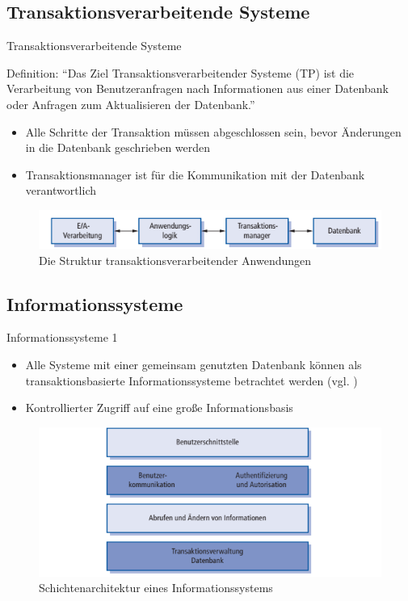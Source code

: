 \documentclass{beamer}
\begin{document}
		\subsection{Transaktionsverarbeitende Systeme}
			\begin{frame}{Transaktionsverarbeitende Systeme}
				\begin{block}{Definition:}
					\enquote{Das Ziel Transaktionsverarbeitender Systeme (TP) ist die Verarbeitung von Benutzeranfragen nach Informationen aus einer Datenbank oder Anfragen zum Aktualisieren der Datenbank.} \cite[S. 204]{sommer}
				\end{block}
				\begin{itemize}
					\item Alle Schritte der Transaktion müssen abgeschlossen sein, bevor Änderungen in die Datenbank geschrieben werden
					\item Transaktionsmanager ist für die Kommunikation mit der Datenbank verantwortlich
				\end{itemize}
				\begin{figure}
					\includegraphics[width=\textwidth]{transaktionssystem-1.png}
					\caption{Die Struktur transaktionsverarbeitender Anwendungen \cite[S. 204]{sommer}}
				\end{figure}
			\end{frame}
		\subsection{Informationssysteme}
			\begin{frame}{Informationssysteme 1}
			\begin{itemize}
				\item Alle Systeme mit einer gemeinsam genutzten Datenbank können als transaktionsbasierte Informationssysteme betrachtet werden (vgl. \cite[S. 205]{sommer})
				\item Kontrollierter Zugriff auf eine große Informationsbasis
			\end{itemize}
			\begin{figure}
				\includegraphics[width=\textwidth]{informationssystem-1.png}
				\caption{Schichtenarchitektur eines Informationssystems \cite[S. 205]{sommer}}
			\end{figure}
			\end{frame}
		
\end{document}
